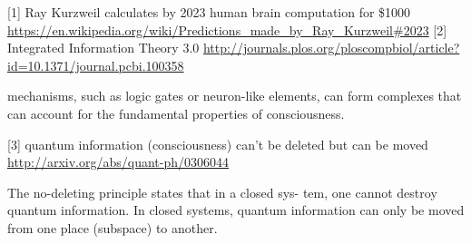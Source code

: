 [1] Ray Kurzweil calculates by 2023 human brain computation for \$1000
\url{https://en.wikipedia.org/wiki/Predictions_made_by_Ray_Kurzweil#2023}
[2] Integrated Information Theory 3.0
\url{http://journals.plos.org/ploscompbiol/article?id=10.1371/journal.pcbi.100358}

    mechanisms, such as logic gates or neuron-like elements, can form complexes that can account for the fundamental properties of consciousness.

[3] quantum information (consciousness) can’t be deleted but can be moved
\url{http://arxiv.org/abs/quant-ph/0306044}

    The no-deleting principle states that in a closed sys-
    tem, one cannot destroy quantum information. In closed
    systems, quantum information can only be moved from
    one place (subspace) to another.

